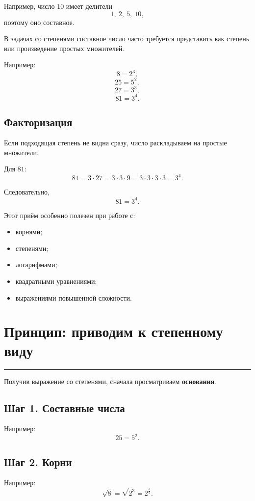\documentclass[a4paper,12pt]{article}
\newcommand{\lessonrule}{%
  \par\vspace{0.3em}
  {\color{accent}\rule{\linewidth}{0.6pt}}
  \vspace{0.5em}
}
\newcommand{\important}[1]{\textbf{\color{darkaccent}#1}}
\begin{document}
Например, число \(10\) имеет делители
\[
1,\ 2,\ 5,\ 10,
\]
поэтому оно составное.

В задачах со степенями составное число часто требуется
представить как степень или произведение простых множителей.

Например:
\[
8=2^3,
\]
\[
25=5^2,
\]
\[
27=3^3,
\]
\[
81=3^4.
\]

\subsection*{\color{accent}Факторизация}

Если подходящая степень не видна сразу, число раскладываем
на простые множители.

Для \(81\):
\[
81=3\cdot27
=3\cdot3\cdot9
=3\cdot3\cdot3\cdot3
=3^4.
\]

Следовательно,
\[
81=3^4.
\]

Этот приём особенно полезен при работе с:

\begin{itemize}
  \item корнями;
  \item степенями;
  \item логарифмами;
  \item квадратными уравнениями;
  \item выражениями повышенной сложности.
\end{itemize}

\section*{\color{darkaccent}Принцип: приводим к степенному виду}
\lessonrule

Получив выражение со степенями, сначала просматриваем
\important{основания}.

\subsection*{\color{accent}Шаг 1. Составные числа}

Например:
\[
25=5^2.
\]

\subsection*{\color{accent}Шаг 2. Корни}

Например:
\[
\sqrt{8}
=
\sqrt{2^3}
=
2^{\frac32}.
\]
\end{document}
